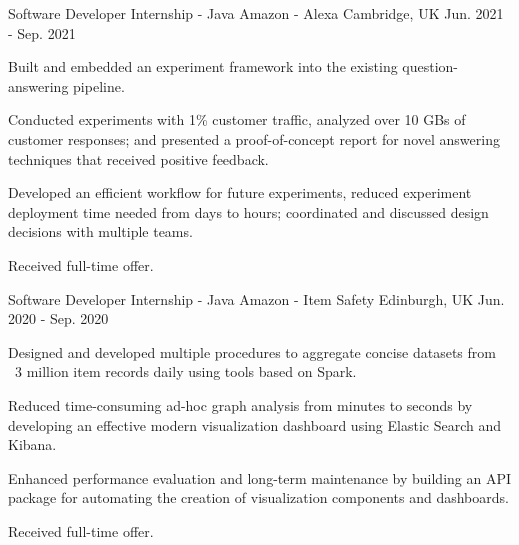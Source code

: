 

\begin{cventries}


  \cventry
    {Software Developer Internship - Java} %
    {Amazon - Alexa} %
    {Cambridge, UK} %
    {Jun. 2021 - Sep. 2021} %
    {
      \begin{cvitems} %
        \item {Built and embedded an experiment framework into the existing question-answering pipeline.}
        \item {Conducted experiments with 1\% customer traffic, analyzed over 10 GBs of customer responses; and presented a proof-of-concept report for novel answering techniques that received positive feedback.}
        \item {Developed an efficient workflow for future experiments, reduced experiment deployment time needed from days to hours; coordinated and discussed design decisions with multiple teams.}
        \item {Received full-time offer.}
      \end{cvitems}
    }

  \cventry
    {Software Developer Internship - Java} %
    {Amazon - Item Safety} %
    {Edinburgh, UK} %
    {Jun. 2020 - Sep. 2020} %
    {
      \begin{cvitems} %
        \item {Designed and developed multiple procedures to aggregate concise datasets from ~3 million item records daily using tools based on Spark.}
        \item {Reduced time-consuming ad-hoc graph analysis from minutes to seconds by developing an effective modern visualization dashboard using Elastic Search and Kibana.}
        \item {Enhanced performance evaluation and long-term maintenance by building an API package for automating the creation of visualization components and dashboards.}
        \item {Received full-time offer.}
      \end{cvitems}
    }


\end{cventries}
